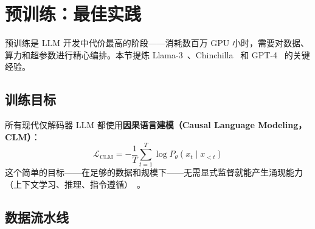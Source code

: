 \section{预训练：最佳实践}
\label{sec:pretraining}

预训练是 LLM 开发中代价最高的阶段——消耗数百万 GPU 小时，需要对数据、算力和超参数进行精心编排。本节提炼 Llama-3~\cite{grattafiori2024llama3}、Chinchilla~\cite{hoffmann2022chinchilla} 和 GPT-4~\cite{openai2023gpt4} 的关键经验。

\subsection{训练目标}
\label{training-objective}

所有现代仅解码器 LLM 都使用\textbf{因果语言建模（Causal Language Modeling，CLM）}：
\[
\mathcal{L}_\text{CLM} = -\frac{1}{T}\sum_{t=1}^T \log P_\theta(x_t \mid x_{<t})
\]
这个简单的目标——在足够的数据和规模下——无需显式监督就能产生涌现能力（上下文学习、推理、指令遵循）~\cite{brown2020language}。

\subsection{数据流水线}
\label{data-pipeline}

